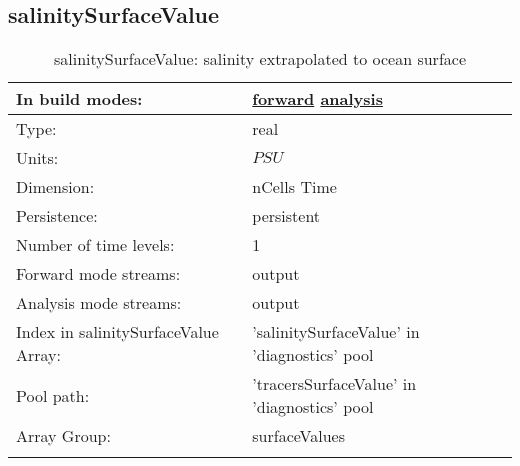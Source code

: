 \subsection[salinitySurfaceValue]{salinitySurfaceValue}
\label{subsec:var_sec_diagnostics_salinitySurfaceValue}
\begin{center}
\begin{longtable}{| p{2.0in} | p{4.0in} |}
        \hline 
        In build modes: & \hyperref[subsec:forward_var_tab_diagnostics]{forward} \hyperref[subsec:analysis_var_tab_diagnostics]{analysis} \\
        \hline 
        Type: & real \\
        \hline 
        Units: & $PSU$ \\
        \hline 
        Dimension: & nCells Time \\
        \hline 
        Persistence: & persistent \\
        \hline 
        Number of time levels: & 1 \\
        \hline 
		 Forward mode streams: &  output \\
        \hline 
		 Analysis mode streams: &  output \\
        \hline 
		 Index in salinitySurfaceValue Array: & 'salinitySurfaceValue' in 'diagnostics' pool \\
		 \hline 
            Pool path: & 'tracersSurfaceValue' in 'diagnostics' pool
 \\
		 \hline 
		 Array Group: & surfaceValues \\
		 \hline 
    \caption{salinitySurfaceValue: salinity extrapolated to ocean surface}
\end{longtable}
\end{center}
